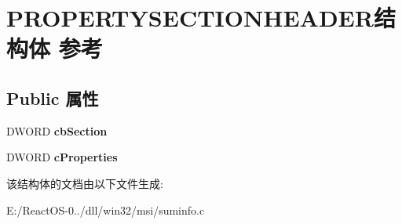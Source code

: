 \hypertarget{struct_p_r_o_p_e_r_t_y_s_e_c_t_i_o_n_h_e_a_d_e_r}{}\section{P\+R\+O\+P\+E\+R\+T\+Y\+S\+E\+C\+T\+I\+O\+N\+H\+E\+A\+D\+E\+R结构体 参考}
\label{struct_p_r_o_p_e_r_t_y_s_e_c_t_i_o_n_h_e_a_d_e_r}
\subsection*{Public 属性}
\begin{DoxyCompactItemize}
\item 
\mbox{\label{struct_p_r_o_p_e_r_t_y_s_e_c_t_i_o_n_h_e_a_d_e_r_a78a880af47949ec02e10b5ad0a88b54f}} 
D\+W\+O\+RD {\bfseries cb\+Section}
\item 
\mbox{\label{struct_p_r_o_p_e_r_t_y_s_e_c_t_i_o_n_h_e_a_d_e_r_a74b5ec7b9b8006709e20399c782d9581}} 
D\+W\+O\+RD {\bfseries c\+Properties}
\end{DoxyCompactItemize}


该结构体的文档由以下文件生成\+:\begin{DoxyCompactItemize}
\item 
E\+:/\+React\+O\+S-\/0../dll/win32/msi/suminfo.\+c\end{DoxyCompactItemize}
